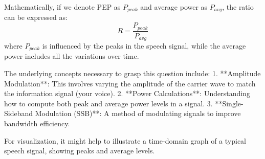 Mathematically, if we denote PEP as \( P_{peak} \) and average power as \( P_{avg} \), the ratio can be expressed as:
\[
R = \frac{P_{peak}}{P_{avg}}
\]
where \( P_{peak} \) is influenced by the peaks in the speech signal, while the average power includes all the variations over time. 

The underlying concepts necessary to grasp this question include:
1. **Amplitude Modulation**: This involves varying the amplitude of the carrier wave to match the information signal (your voice).
2. **Power Calculations**: Understanding how to compute both peak and average power levels in a signal.
3. **Single-Sideband Modulation (SSB)**: A method of modulating signals to improve bandwidth efficiency.

For visualization, it might help to illustrate a time-domain graph of a typical speech signal, showing peaks and average levels. %